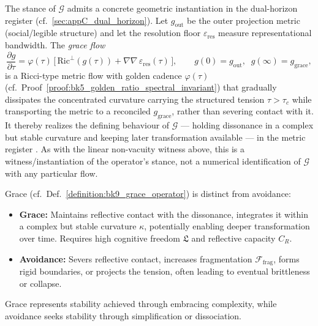 \begin{remark}
\label{remark:bk9_grace_flow_geometric_witness}
The stance of $\mathcal{G}$ admits a concrete geometric instantiation in the
dual-horizon register (cf.~\ref{sec:appC_dual_horizon}). Let $g_{\mathrm{out}}$
be the outer projection metric (social/legible structure) and let the resolution
floor $\varepsilon_{\mathrm{res}}$ measure representational bandwidth. The
\emph{grace flow}
\[
\frac{\partial g}{\partial \tau}
= \varphi(\tau)\,\big[\,\mathrm{Ric}^{\perp}(g(\tau)) + \nabla\nabla\,\varepsilon_{\mathrm{res}}(\tau)\,\big],
\qquad
g(0)=g_{\mathrm{out}},\;\; g(\infty)=g_{\mathrm{grace}},
\]
is a Ricci-type metric flow with golden cadence $\varphi(\tau)$
(cf.~Proof~\ref{proof:bk5_golden_ratio_spectral_invariant}) that gradually
dissipates the concentrated curvature carrying the structured tension
$\tau>\tau_c$ while transporting the metric to a reconciled $g_{\mathrm{grace}}$,
rather than severing contact with it. It thereby realizes the defining behaviour
of $\mathcal{G}$ --- holding dissonance in a complex but stable curvature and
keeping later transformation available --- in the metric register
\citep{tiffany2025wicked}. As with the linear non-vacuity witness above, this is
a witness/instantiation of the operator's stance, not a numerical identification
of $\mathcal{G}$ with any particular flow.
\end{remark}
\begin{proposition}
\label{proposition:bk9_grace_vs_avoidance}
Grace (cf.~Def.~\ref{definition:bk9_grace_operator}) is distinct from avoidance:
\begin{itemize}
    \item \textbf{Grace:} Maintains reflective contact with the dissonance, integrates it within a complex but stable curvature $\kappa$, potentially enabling deeper transformation over time. Requires high cognitive freedom $\mathfrak{L}$ and reflective capacity $C_R$.
    \item \textbf{Avoidance:} Severs reflective contact, increases fragmentation $\mathcal{F}_{\text{frag}}$, forms rigid boundaries, or projects the tension, often leading to eventual brittleness or collapse.
\end{itemize}
Grace represents stability achieved through embracing complexity, while avoidance seeks stability through simplification or dissociation.
\end{proposition}
